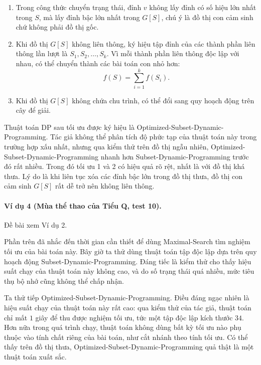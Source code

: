 \documentclass[11pt]{article}
\begin{document}
\begin{enumerate}
  \item Trong công thức chuyển trạng thái, đỉnh \(v\) không lấy đỉnh có số hiệu
  lớn nhất trong \(S\), mà lấy đỉnh bậc lớn nhất trong \(G[S]\), chú ý là đồ thị
  con cảm sinh chứ không phải đồ thị gốc.

  \item Khi đồ thị \(G[S]\) không liên thông, ký hiệu tập đỉnh của các thành
  phần liên thông lần lượt là \(S_1,S_2,\ldots,S_k\). Vì mỗi thành phần liên
  thông độc lập với nhau, có thể chuyển thành các bài toán con nhỏ hơn:
  \[
    f(S)=\sum_{i=1}^{k}f(S_i).
  \]

  \item Khi đồ thị \(G[S]\) không chứa chu trình, có thể đổi sang quy hoạch
  động trên cây để giải.
\end{enumerate}

Thuật toán DP sau tối ưu được ký hiệu là
Optimized-Subset-Dynamic-Programming. Tác giả không thể phân tích độ phức tạp
của thuật toán này trong trường hợp xấu nhất, nhưng qua kiểm thử trên đồ thị
ngẫu nhiên, Optimized-Subset-Dynamic-Programming nhanh hơn
Subset-Dynamic-Programming trước đó rất nhiều. Trong đó tối ưu 1 và 2 có hiệu
quả rõ rệt, nhất là với đồ thị khá thưa. Lý do là khi liên tục xóa các đỉnh
bậc lớn trong đồ thị thưa, đồ thị con cảm sinh \(G[S]\) rất dễ trở nên không
liên thông.

\paragraph{Ví dụ 4 (Mùa thể thao của Tiểu Q, test 10).}
Đề bài xem Ví dụ 2.

Phần trên đã nhắc đến thời gian cần thiết để dùng Maximal-Search tìm nghiệm tối
ưu của bài toán này. Bây giờ ta thử dùng thuật toán tập độc lập dựa trên quy
hoạch động Subset-Dynamic-Programming. Đáng tiếc là kiểm thử cho thấy hiệu suất
chạy của thuật toán này không cao, và do số trạng thái quá nhiều, mức tiêu thụ
bộ nhớ cũng không thể chấp nhận.

Ta thử tiếp Optimized-Subset-Dynamic-Programming. Điều đáng ngạc nhiên là hiệu
suất chạy của thuật toán này rất cao: qua kiểm thử của tác giả, thuật toán chỉ
mất \(1\) giây để thu được nghiệm tối ưu, tức một tập độc lập kích thước
\(34\). Hơn nữa trong quá trình chạy, thuật toán không dùng bất kỳ tối ưu nào
phụ thuộc vào tính chất riêng của bài toán, như cắt nhánh theo tính tối ưu. Có
thể thấy trên đồ thị thưa, Optimized-Subset-Dynamic-Programming quả thật là một
thuật toán xuất sắc.
\end{document}
